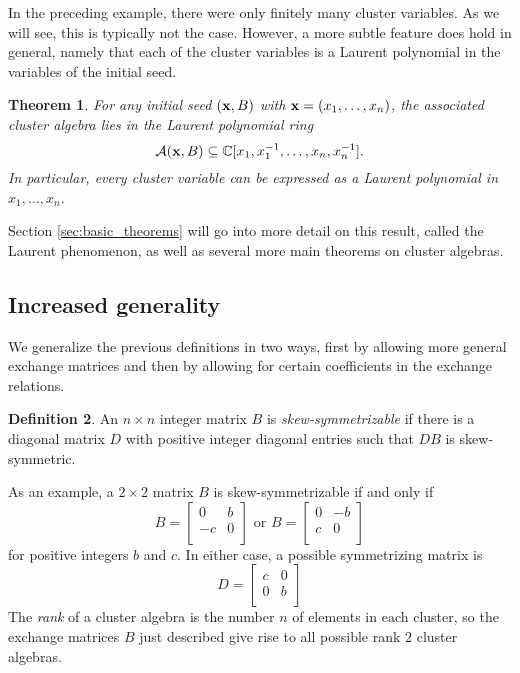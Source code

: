 \documentclass{amsart}
\newtheorem{theorem}{Theorem}[section]
\theoremstyle{definition}
\newtheorem{definition}[theorem]{Definition}
\theoremstyle{remark}
\numberwithin{equation}{section}
\newcommand{\cA}{{\mathcal{A}}}
\newcommand{\x}{{\bf x}}
\newcommand{\CC}{{\mathbb{C}}}
\begin{document}
	In the preceding example, there were only finitely many cluster variables.  As we will see, this is typically not the case.  However, a more subtle feature does hold in general, namely that each of the cluster variables is a Laurent polynomial in the variables of the initial seed.  
	\begin{theorem}\label{th:Laurent phenomenon}
		For any initial seed $(\x,B)$ with $\x = (x_1,\ldots, x_n)$, the associated cluster algebra lies in the Laurent polynomial ring
		\begin{displaymath}
			\cA(\x,B) \subseteq \CC[x_1, x_1^{-1}, \ldots, x_n, x_n^{-1}].
		\end{displaymath}
		In particular, every cluster variable can be expressed as a Laurent polynomial in $x_1,\ldots, x_n$.
	\end{theorem}
	Section \ref{sec:basic_theorems} will go into more detail on this result, called the Laurent phenomenon, as well as several more main theorems on cluster algebras.
	
	\subsection{Increased generality}
	We generalize the previous definitions in two ways, first by allowing more general exchange matrices and then by allowing for certain coefficients in the exchange relations.
	
	\begin{definition}
		An $n \times n$ integer matrix $B$ is \emph{skew-symmetrizable} if there is a diagonal matrix $D$ with positive integer diagonal entries such that $DB$ is skew-symmetric.
	\end{definition}
	
	As an example, a $2 \times 2$ matrix $B$ is skew-symmetrizable if and only if
	\begin{displaymath}
		B = \left[ \begin{array}{cc} 	0 & b \\	-c & 0 \\	\end{array}	\right]
		\textrm{ or } B = \left[ \begin{array}{cc} 	0 & -b \\	c & 0 \\	\end{array}	\right]
	\end{displaymath}
	for positive integers $b$ and $c$.  In either case, a possible symmetrizing matrix is
	\begin{displaymath}
		D = \left[ \begin{array}{cc} 	c & 0 \\	0 & b \\	\end{array}	\right]
	\end{displaymath}
	The \emph{rank} of a cluster algebra is the number $n$ of elements in each cluster, so the exchange matrices $B$ just described give rise to all possible rank $2$ cluster algebras.
	
\end{document}
